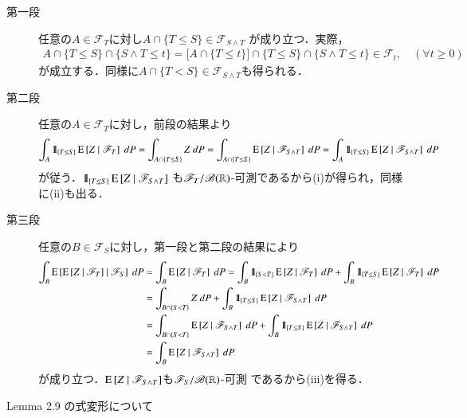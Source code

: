 	\begin{prf}\mbox{}
		\begin{description}
			\item[第一段]
				任意の$A \in \mathscr{F}_T$に対し$A \cap \{T \leq S\} \in \mathscr{F}_{S \wedge T}$
				が成り立つ．実際，
				\begin{align}
					A \cap \{T \leq S\} \cap \{S \wedge T \leq t\}
					= \biggl[ A \cap \{T \leq t\} \biggr] \cap \{T \leq S\} \cap \{S \wedge T \leq t\}
					\in \mathscr{F}_t,
					\quad (\forall t \geq 0)
				\end{align}
				が成立する．同様に$A \cap \{T < S\} \in \mathscr{F}_{S \wedge T}$も得られる．
				
			\item[第二段]
				任意の$A \in \mathscr{F}_T$に対し，前段の結果より
				\begin{align}
					\int_A \mbox{1}\hspace{-0.25em}\mbox{l}_{\{T \leq S\}} \operatorname{E} \left[ Z \ \middle|\ \mathscr{F}_T \right]\ dP
					= \int_{A \cap \{T \leq S\}} Z\ dP
					= \int_{A \cap \{T \leq S\}} \operatorname{E} \left[ Z \ \middle|\ \mathscr{F}_{S \wedge T} \right]\ dP
					= \int_A \mbox{1}\hspace{-0.25em}\mbox{l}_{\{T \leq S\}} \operatorname{E} \left[ Z \ \middle|\ \mathscr{F}_{S \wedge T} \right]\ dP
				\end{align}
				が従う．$\mbox{1}\hspace{-0.25em}\mbox{l}_{\{T \leq S\}} \operatorname{E} \left[ Z \ \middle|\ \mathscr{F}_{S \wedge T} \right]$
				も$\mathscr{F}_T/\mathscr{B}(\mathbb{R})$-可測であるから(i)が得られ，同様に(ii)も出る．
			
			\item[第三段]
				任意の$B \in \mathscr{F}_S$に対し，第一段と第二段の結果により
				\begin{align}
					\int_B \operatorname{E} \left[ \operatorname{E} \left[ Z \ \middle|\ \mathscr{F}_T \right] \ \middle|\ \mathscr{F}_S \right]\ dP
					&= \int_B \operatorname{E} \left[ Z \ \middle|\ \mathscr{F}_T \right]\ dP
					= \int_B \mbox{1}\hspace{-0.25em}\mbox{l}_{\{S < T\}} \operatorname{E} \left[ Z \ \middle|\ \mathscr{F}_T \right]\ dP
						+ \int_B \mbox{1}\hspace{-0.25em}\mbox{l}_{\{T \leq S\}} \operatorname{E} \left[ Z \ \middle|\ \mathscr{F}_T \right]\ dP \\
					&= \int_{B \cap \{S < T\}} Z\ dP
						+ \int_B \mbox{1}\hspace{-0.25em}\mbox{l}_{\{T \leq S\}} \operatorname{E} \left[ Z \ \middle|\ \mathscr{F}_{S \wedge T} \right]\ dP \\
					&= \int_{B \cap \{S < T\}} \operatorname{E} \left[ Z \ \middle|\ \mathscr{F}_{S \wedge T} \right]\ dP
						+ \int_B \mbox{1}\hspace{-0.25em}\mbox{l}_{\{T \leq S\}} \operatorname{E} \left[ Z \ \middle|\ \mathscr{F}_{S \wedge T} \right]\ dP \\
					&= \int_B \operatorname{E} \left[ Z \ \middle|\ \mathscr{F}_{S \wedge T} \right]\ dP
				\end{align}
				が成り立つ．$\operatorname{E} \left[ Z \ \middle|\ \mathscr{F}_{S \wedge T} \right]$も$\mathscr{F}_S/\mathscr{B}(\mathbb{R})$-可測
				であるから(iii)を得る．
				\QED
		\end{description}
	\end{prf}
	
	\begin{itembox}[l]{Lemma 2.9 の式変形について}
		\begin{align}
			
		\end{align}
	\end{itembox}